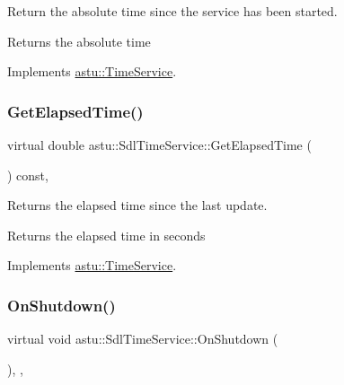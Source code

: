 Return the absolute time since the service has been started.

\begin{DoxyReturn}{Returns}
the absolute time 
\end{DoxyReturn}


Implements \hyperlink{classastu_1_1TimeService_a4c2eb07963ed65649f17e331ff20735a}{astu\+::\+Time\+Service}.

\mbox{\label{classastu_1_1SdlTimeService_a6652d19cae14e20ec85a1808fc8e87b7}} 
\subsubsection{\texorpdfstring{Get\+Elapsed\+Time()}{GetElapsedTime()}}
{\footnotesize\ttfamily virtual double astu\+::\+Sdl\+Time\+Service\+::\+Get\+Elapsed\+Time (\begin{DoxyParamCaption}{ }\end{DoxyParamCaption}) const\hspace{0.3cm}{\ttfamily [override]}, {\ttfamily [virtual]}}

Returns the elapsed time since the last update.

\begin{DoxyReturn}{Returns}
the elapsed time in seconds 
\end{DoxyReturn}


Implements \hyperlink{classastu_1_1TimeService_af3b4f5f1b64d87e6fd8a2b81c48a2bf4}{astu\+::\+Time\+Service}.

\mbox{\label{classastu_1_1SdlTimeService_a6a1b864beed186413933dd8b97a393a2}} 
\subsubsection{\texorpdfstring{On\+Shutdown()}{OnShutdown()}}
{\footnotesize\ttfamily virtual void astu\+::\+Sdl\+Time\+Service\+::\+On\+Shutdown (\begin{DoxyParamCaption}{ }\end{DoxyParamCaption})\hspace{0.3cm}{\ttfamily [override]}, {\ttfamily [protected]}, {\ttfamily [virtual]}}

